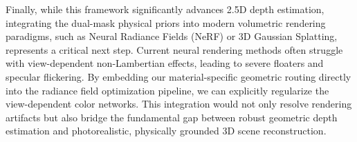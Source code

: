 Finally, while this framework significantly advances 2.5D depth estimation, integrating the dual-mask physical priors into modern volumetric rendering paradigms, such as Neural Radiance Fields (NeRF) or 3D Gaussian Splatting, represents a critical next step. Current neural rendering methods often struggle with view-dependent non-Lambertian effects, leading to severe floaters and specular flickering. By embedding our material-specific geometric routing directly into the radiance field optimization pipeline, we can explicitly regularize the view-dependent color networks. This integration would not only resolve rendering artifacts but also bridge the fundamental gap between robust geometric depth estimation and photorealistic, physically grounded 3D scene reconstruction.